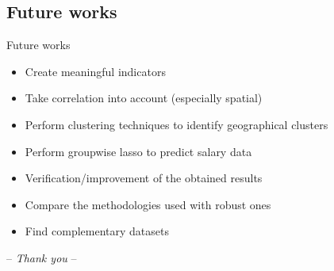 \documentclass[12pt]{beamer}
\begin{document}
\subsection{Future works}


\begin{frame}{\textcolor{bscuro}{Future works}}
	\begin{itemize}
		\item Create meaningful indicators
		\item Take correlation into account (especially spatial)
		\item Perform clustering techniques to identify geographical clusters
		\item Perform groupwise lasso to predict salary data
		\item Verification/improvement of the obtained results 
		\item Compare the methodologies used with robust ones
		\item Find complementary datasets
	\end{itemize}	
\end{frame}		


\begin{frame}
	\centerline{\Huge\textcolor{bscuro}{ -- \emph{Thank you} -- }}
\end{frame}
\end{document}
